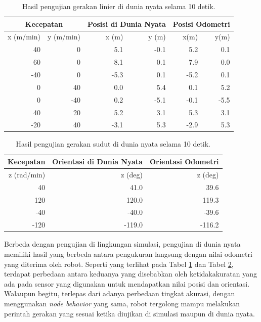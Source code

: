 \begin{table}
  \caption{Hasil pengujian gerakan linier di dunia nyata selama 10 detik.}
  \label{tab:hasilujilinierdunianyata}
  \centering
  \begin{tabular}{rr|rr|rr}
    \toprule
    \multicolumn{2}{c|}{Kecepatan} &
    \multicolumn{2}{|c|}{Posisi di Dunia Nyata} &
    \multicolumn{2}{|c}{Posisi Odometri} \\
    \midrule
    x (m/min) & y (m/min) & x (m) & y (m) & x(m)  & y(m) \\
    \midrule
    40        & 0         & 5.1   & -0.1  & 5.2   & 0.1 \\
    60        & 0         & 8.1   & 0.1   & 7.9   & 0.0 \\
    -40       & 0         & -5.3  & 0.1   & -5.2  & 0.1 \\
    0         & 40        & 0.0   & 5.4   & 0.1   & 5.2 \\
    0         & -40       & 0.2   & -5.1  & -0.1  & -5.5 \\
    40        & 20        & 5.2   & 3.1   & 5.3   & 3.1 \\
    -20       & 40        & -3.1  & 5.3   & -2.9  & 5.3 \\
    \bottomrule
  \end{tabular}
\end{table}

\begin{table}
  \caption{Hasil pengujian gerakan sudut di dunia nyata selama 10 detik.}
  \label{tab:hasilujisudutdunianyata}
  \centering
  \begin{tabular}{r|r|r}
    \toprule
    Kecepatan   & Orientasi di Dunia Nyata  & Orientasi Odometri \\
    \midrule
    z (rad/min) & z (deg)                   & z (deg) \\
    \midrule
    40          & 41.0                      & 39.6 \\
    120         & 120.0                     & 119.3 \\
    -40         & -40.0                     & -39.6 \\
    -120        & -119.0                    & -116.2 \\
    \bottomrule
  \end{tabular}
\end{table}

Berbeda dengan pengujian di lingkungan simulasi, pengujian di dunia nyata memiliki hasil yang berbeda antara pengukuran langsung dengan nilai odometri yang diterima oleh robot.
Seperti yang terlihat pada Tabel \ref{tab:hasilujilinierdunianyata} dan Tabel \ref{tab:hasilujisudutdunianyata}, terdapat perbedaan antara keduanya yang disebabkan oleh ketidakakuratan yang ada pada sensor yang digunakan untuk mendapatkan nilai posisi dan orientasi.
Walaupun begitu, terlepas dari adanya perbedaan tingkat akurasi, dengan menggunakan \emph{node behavior} yang sama, robot tergolong mampu melakukan perintah gerakan yang sesuai ketika diujikan di simulasi maupun di dunia nyata.

